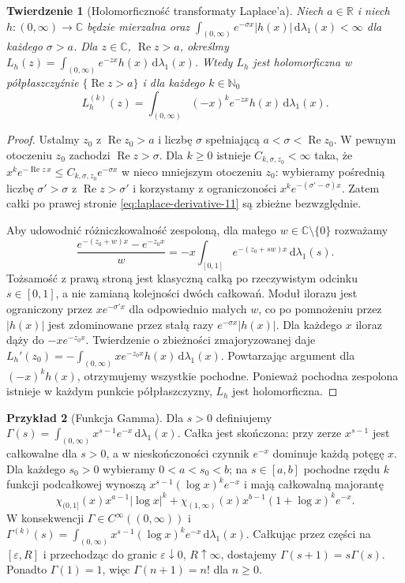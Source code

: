 \documentclass[11pt,a4paper,oneside]{book}
\numberwithin{equation}{chapter}
\theoremstyle{plain}
\newtheorem{twierdzenie}{Twierdzenie}[chapter]
\theoremstyle{definition}
\newtheorem{przyklad}[twierdzenie]{Przykład}
\theoremstyle{remark}
\begin{document}
\begin{twierdzenie}[Holomorficzność transformaty Laplace'a]
\label{thm:laplace-holo-11}
Niech $a\in\mathbb R$ i niech $h:(0,\infty)\to\mathbb C$
będzie mierzalna oraz
$\int_{(0,\infty)}e^{-\sigma x}|h(x)|\,\mathrm d\lambda_1(x)<\infty$
dla każdego $\sigma>a$. Dla $z\in\mathbb C$,
$\operatorname{Re}z>a$, określmy
$L_h(z)=\int_{(0,\infty)}e^{-zx}h(x)\,\mathrm d\lambda_1(x)$.
Wtedy $L_h$ jest holomorficzna w półpłaszczyźnie
$\{\operatorname{Re}z>a\}$ i dla każdego $k\in\mathbb N_0$
\begin{equation}\label{eq:laplace-derivative-11}
L_h^{(k)}(z)=\int_{(0,\infty)}(-x)^k e^{-zx}h(x)
\,\mathrm d\lambda_1(x).
\end{equation}
\end{twierdzenie}
\begin{proof}
Ustalmy $z_0$ z $\operatorname{Re}z_0>a$ i liczbę
$\sigma$ spełniającą $a<\sigma<\operatorname{Re}z_0$.
W pewnym otoczeniu $z_0$ zachodzi $\operatorname{Re}z>\sigma$.
Dla $k\ge0$ istnieje $C_{k,\sigma,z_0}<\infty$ taka, że
$x^k e^{-\operatorname{Re}z\,x}\le
C_{k,\sigma,z_0}e^{-\sigma x}$ w nieco mniejszym
otoczeniu $z_0$: wybieramy pośrednią liczbę
$\sigma'>\sigma$ z $\operatorname{Re}z>\sigma'$
i korzystamy z ograniczoności $x^ke^{-(\sigma'-\sigma)x}$.
Zatem całki po prawej stronie
\eqref{eq:laplace-derivative-11} są zbieżne bezwzględnie.

Aby udowodnić różniczkowalność zespoloną, dla małego
$w\in\mathbb C\setminus\{0\}$ rozważamy
\[
\frac{e^{-(z_0+w)x}-e^{-z_0x}}{w}
=-x\int_{[0,1]}e^{-(z_0+sw)x}\,\mathrm d\lambda_1(s).
\]
Tożsamość z prawą stroną jest klasyczną
całką po rzeczywistym odcinku $s\in[0,1]$,
a nie zamianą kolejności dwóch całkowań.
Moduł ilorazu jest ograniczony przez
$x e^{-\sigma'x}$ dla odpowiednio małych $w$,
co po pomnożeniu przez $|h(x)|$ jest zdominowane
przez stałą razy $e^{-\sigma x}|h(x)|$.
Dla każdego $x$ iloraz dąży do $-xe^{-z_0x}$.
Twierdzenie o zbieżności zmajoryzowanej daje
$L_h'(z_0)=-\int_{(0,\infty)}xe^{-z_0x}h(x)
\,\mathrm d\lambda_1(x)$. Powtarzając argument dla
$(-x)^kh(x)$, otrzymujemy wszystkie pochodne.
Ponieważ pochodna zespolona istnieje w każdym punkcie
półpłaszczyzny, $L_h$ jest holomorficzna.
\end{proof}

\begin{przyklad}[Funkcja Gamma]
\label{ex:gamma-param-11}
Dla $s>0$ definiujemy
$\Gamma(s)=\int_{(0,\infty)}x^{s-1}e^{-x}\,\mathrm d\lambda_1(x)$.
Całka jest skończona: przy zerze $x^{s-1}$ jest
całkowalne dla $s>0$, a w nieskończoności czynnik
$e^{-x}$ dominuje każdą potęgę $x$.
Dla każdego $s_0>0$ wybieramy $0<a<s_0<b$;
na $s\in[a,b]$ pochodne rzędu $k$ funkcji podcałkowej
wynoszą $x^{s-1}(\log x)^k e^{-x}$ i mają całkowalną
majorantę
\[
\chi_{(0,1]}(x)x^{a-1}|\log x|^k
+\chi_{(1,\infty)}(x)x^{b-1}(1+\log x)^k e^{-x}.
\]
W konsekwencji $\Gamma\in C^\infty((0,\infty))$ i
$\Gamma^{(k)}(s)=\int_{(0,\infty)}
 x^{s-1}(\log x)^k e^{-x}\,\mathrm d\lambda_1(x)$.
Całkując przez części na $[\varepsilon,R]$ i przechodząc
do granic $\varepsilon\downarrow0$, $R\uparrow\infty$,
dostajemy $\Gamma(s+1)=s\Gamma(s)$.
Ponadto $\Gamma(1)=1$, więc $\Gamma(n+1)=n!$ dla $n\ge0$.
\end{przyklad}
\end{document}
